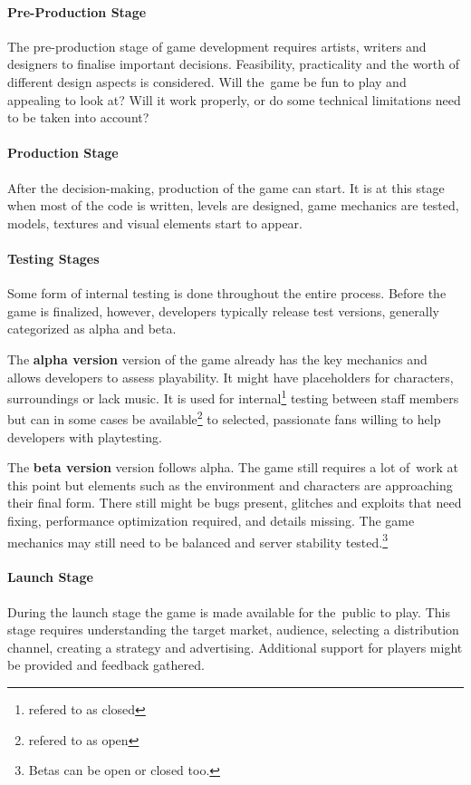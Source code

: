 \paragraph{Pre-Production Stage}
The pre-production stage of game development requires artists, writers and designers to finalise important decisions. Feasibility, practicality and the worth of different design aspects is considered. Will the~game be fun to play and appealing to look at? Will it work properly, or do some technical limitations need to be taken into account?
\cite{bramble_7-stages, rocket_6-stages}

\paragraph{Production Stage}
After the decision-making, production of the game can start. It is at this stage when most of the code is written, levels are designed, game mechanics are tested, models, textures and visual elements start to appear.
\cite{bramble_7-stages, rocket_6-stages}

\paragraph{Testing Stages}
Some form of internal testing is done throughout the entire process. Before the game is finalized, however, developers typically release test versions, generally categorized as alpha and beta.

The \textbf{alpha version} version of the game already has the key mechanics and allows developers to assess playability. It might have placeholders for characters, surroundings or lack music. It is used for internal\footnote{refered to as closed} testing between staff members but can in some cases be available\footnote{refered to as open} to selected, passionate fans willing to help developers with playtesting.
\cite{bramble_7-stages, rocket_6-stages, esler_viable-games}

The \textbf{beta version} version follows alpha. The game still requires a lot of~work at this point but elements such as the environment and characters are approaching their final form. There still might be bugs present, glitches and exploits that need fixing, performance optimization required, and details missing. The game mechanics may still need to be balanced and server stability tested.\footnote{Betas can be open or closed too.}
\cite{bramble_7-stages, rocket_6-stages, esler_viable-games}

\paragraph{Launch Stage}
During the launch stage the game is made available for the~public to play. This stage requires understanding the target market, audience, selecting a distribution channel, creating a strategy and advertising. Additional support for players might be provided and feedback gathered.
\cite{bramble_7-stages, rocket_6-stages, esler_viable-games}

